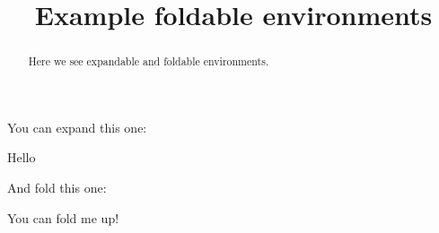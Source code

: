 \documentclass{ximera}
\title{Example foldable environments}
\begin{document}
\begin{abstract}
  Here we see expandable and foldable environments.
\end{abstract}
\maketitle

You can expand this one:

\begin{expandable}
  Hello
 \begin{center}
 \end{center}
\end{expandable}



And fold this one:

\begin{foldable}
  You can fold me up!
\end{foldable}
\end{document}
